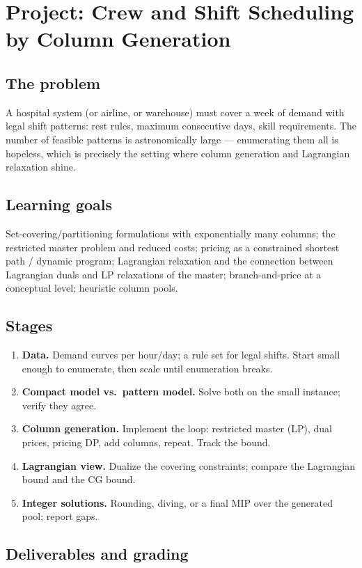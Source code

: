 \chapter{Project: Crew and Shift Scheduling by Column Generation}
\label{ch:project-crew}

\section*{The problem}
A hospital system (or airline, or warehouse) must cover a week of demand
with legal shift patterns: rest rules, maximum consecutive days, skill
requirements. The number of feasible patterns is astronomically large —
enumerating them all is hopeless, which is precisely the setting where
column generation and Lagrangian relaxation shine.

\section*{Learning goals}
Set-covering/partitioning formulations with exponentially many columns;
the restricted master problem and reduced costs; pricing as a constrained
shortest path / dynamic program; Lagrangian relaxation and the connection
between Lagrangian duals and LP relaxations of the master; branch-and-price
at a conceptual level; heuristic column pools.

\section*{Stages}
\begin{enumerate}
  \item \textbf{Data.} Demand curves per hour/day; a rule set for legal
    shifts. Start small enough to enumerate, then scale until enumeration
    breaks.
  \item \textbf{Compact model vs.\ pattern model.} Solve both on the small
    instance; verify they agree.
  \item \textbf{Column generation.} Implement the loop: restricted master
    (LP), dual prices, pricing DP, add columns, repeat. Track the bound.
  \item \textbf{Lagrangian view.} Dualize the covering constraints; compare
    the Lagrangian bound and the CG bound.
  \item \textbf{Integer solutions.} Rounding, diving, or a final MIP over
    the generated pool; report gaps.
\end{enumerate}

\section*{Deliverables and grading}
